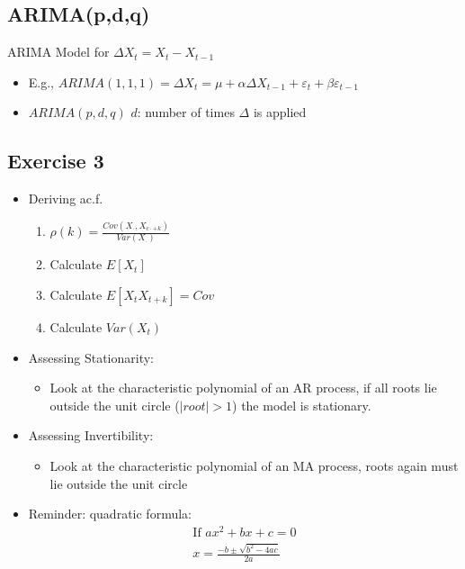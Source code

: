 \subsection{ARIMA(p,d,q)}

ARIMA Model for \(\Delta X_t=X_t-X_{t-1}\)
\begin{itemize}
    \item[] E.g., \( ARIMA(1,1,1)=\Delta X_t=\mu +\alpha \Delta X_{t-1} + \varepsilon_t + \beta \varepsilon_{t-1} \)
    \item $ARIMA(p,d,q)$ \quad $d$: number of times $\Delta$ is applied
\end{itemize}


\subsection{Exercise 3}
\begin{itemize}
    \item Deriving ac.f. 
    \begin{enumerate}
        \item[] $\rho(k)=\frac{Cov(X_\cdot, X_{c\cdot + k})}{Var(X_\cdot)} $
        \item Calculate $E[X_t]$
        \item Calculate $E[X_t X_{t+k}] = Cov$
        \item Calculate $Var(X_t)$
    \end{enumerate}
    \item Assessing Stationarity:
    \begin{itemize}
        \item Look at the characteristic polynomial of an AR process, if all roots lie outside the unit circle ($|root|>1$) the model is stationary.
    \end{itemize}
    \item Assessing Invertibility:
    \begin{itemize}
        \item Look at the characteristic polynomial of an MA process, roots again must lie outside the unit circle
    \end{itemize}
    \item Reminder: quadratic formula:
    \begin{align*}
        \text{If } ax^2 +bx+c=0 \\
        x=\frac{-b \pm \sqrt{b^2-4ac}}{2a}
    \end{align*}
\end{itemize}